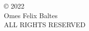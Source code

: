 \vspace*{\fill}

\begin{center}
© 2022\\
Omes Felix Baltes\\
ALL RIGHTS RESERVED
\end{center}
\thispagestyle{empty}